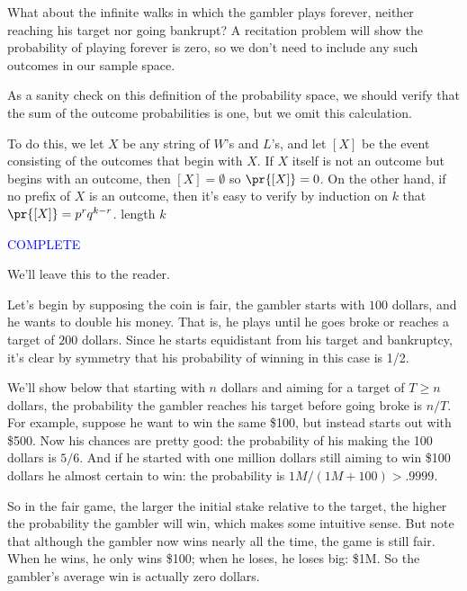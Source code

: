 \begin{staffnotes}
What about the infinite walks in which the gambler plays forever, neither
reaching his target nor going bankrupt?  A recitation problem will show the
probability of playing forever is zero, so we don't need to include any
such outcomes in our sample space.

As a sanity check on this definition of the probability space, we should
verify that the sum of the outcome probabilities is one, but we omit this
calculation.

To do this, we let $X$ be any string of $W$'s and $L$'s, and let $[X]$ be
the event consisting of the outcomes that begin with $X$.  If $X$ itself
is not an outcome but begins with an outcome, then $[X] = \emptyset$ so
$\pr{[X]} = 0$.  On the other hand, if no prefix of $X$ is an outcome,
then it's easy to verify by induction on $k$ that $\pr{[X]} = p^rq^{k-r}$.
length $k$

\textcolor{blue}{COMPLETE}

We'll leave this to the reader.

\end{staffnotes}



Let's begin by supposing the coin is fair, the gambler starts with $100$
dollars, and he wants to double his money.  That is, he plays until he
goes broke or reaches a target of $200$ dollars.  Since he starts
equidistant from his target and bankruptcy, it's clear by symmetry that
his probability of winning in this case is 1/2.

We'll show below that starting with $n$ dollars and aiming for a target of
$T \geq n$ dollars, the probability the gambler reaches his target before
going broke is $n/T$.  For example, suppose he want to win the same \$100,
but instead starts out with \$500.  Now his chances are pretty good: the
probability of his making the 100 dollars is $5/6$.  And if he started
with one million dollars still aiming to win \$100 dollars he almost
certain to win: the probability is $1M/(1M + 100) > .9999$.

So in the fair game, the larger the initial stake relative to the target,
the higher the probability the gambler will win, which makes some
intuitive sense.  But note that although the gambler now wins nearly all
the time, the game is still fair.  When he wins, he only wins \$100; when
he loses, he loses big: \$1M.  So the gambler's average win is actually
zero dollars.

